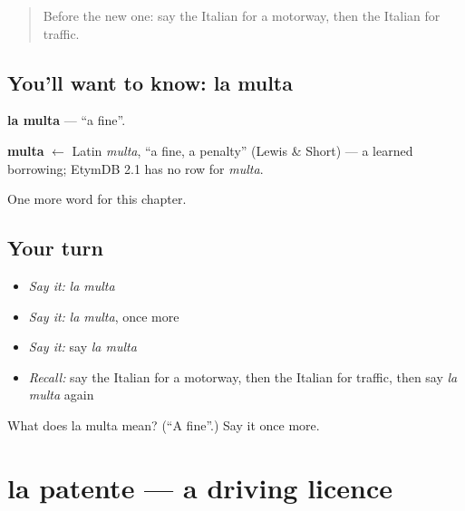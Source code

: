 \label{lesson:IT-C167-multa}



\begin{quote}
Before the new one: say the Italian for a motorway, then the Italian for traffic.
\end{quote}

\subsection*{You'll want to know: la multa}
\textbf{la multa} — \textquotedblleft{}a fine\textquotedblright{}.

\begin{cousinweb}
\textbf{multa} $\leftarrow$ Latin \emph{multa}, \textquotedblleft{}a fine, a penalty\textquotedblright{} (Lewis \& Short) — a learned borrowing; EtymDB 2.1 has no row for \emph{multa}.
\end{cousinweb}

\begin{grammarlens}[title={What you've built}]
One more word for this chapter.
\end{grammarlens}

\subsection*{Your turn}
\begin{itemize}
\raggedright
  \item \emph{Say it:} \emph{la multa}
  \item \emph{Say it:} \emph{la multa}, once more
  \item \emph{Say it:} say \emph{la multa}
  \item \emph{Recall:} say the Italian for a motorway, then the Italian for traffic, then say \emph{la multa} again
\end{itemize}

\begin{tcolorbox}[breakable,colback=teal!4,colframe=teal!35!black,title={Before you move on}]
What does la multa mean? (\textquotedblleft{}A fine\textquotedblright{}.) Say it once more.
\end{tcolorbox}
\section[la patente]{la patente — a driving licence}

\label{lesson:IT-C167-patente}



